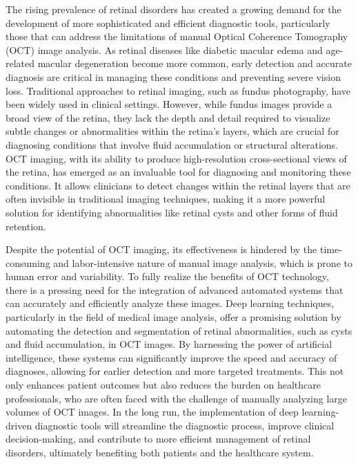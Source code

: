 \documentclass{article}
\begin{document}
The rising prevalence of retinal disorders has created a growing demand for the development of more sophisticated and efficient diagnostic tools, particularly those that can address the limitations of manual Optical Coherence Tomography (OCT) image analysis. As retinal diseases like diabetic macular edema and age-related macular degeneration become more common, early detection and accurate diagnosis are critical in managing these conditions and preventing severe vision loss. Traditional approaches to retinal imaging, such as fundus photography, have been widely used in clinical settings. However, while fundus images provide a broad view of the retina, they lack the depth and detail required to visualize subtle changes or abnormalities within the retina’s layers, which are crucial for diagnosing conditions that involve fluid accumulation or structural alterations. OCT imaging, with its ability to produce high-resolution cross-sectional views of the retina, has emerged as an invaluable tool for diagnosing and monitoring these conditions. It allows clinicians to detect changes within the retinal layers that are often invisible in traditional imaging techniques, making it a more powerful solution for identifying abnormalities like retinal cysts and other forms of fluid retention.

Despite the potential of OCT imaging, its effectiveness is hindered by the time-consuming and labor-intensive nature of manual image analysis, which is prone to human error and variability. To fully realize the benefits of OCT technology, there is a pressing need for the integration of advanced automated systems that can accurately and efficiently analyze these images. Deep learning techniques, particularly in the field of medical image analysis, offer a promising solution by automating the detection and segmentation of retinal abnormalities, such as cysts and fluid accumulation, in OCT images. By harnessing the power of artificial intelligence, these systems can significantly improve the speed and accuracy of diagnoses, allowing for earlier detection and more targeted treatments. This not only enhances patient outcomes but also reduces the burden on healthcare professionals, who are often faced with the challenge of manually analyzing large volumes of OCT images. In the long run, the implementation of deep learning-driven diagnostic tools will streamline the diagnostic process, improve clinical decision-making, and contribute to more efficient management of retinal disorders, ultimately benefiting both patients and the healthcare system.
\end{document}
